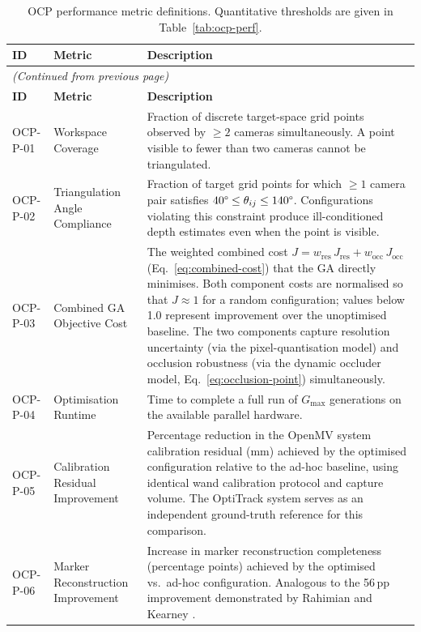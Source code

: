 {\small\setlength{\tabcolsep}{4pt}
\begin{longtable}{p{1.5cm} >{\raggedright\arraybackslash}p{3.2cm} >{\raggedright\arraybackslash}p{\dimexpr\linewidth-1.5cm-3.2cm-6\tabcolsep\relax}}
\caption[OCP performance metric definitions.]{OCP performance metric definitions. Quantitative thresholds are given in Table~\ref{tab:ocp-perf}.}
\label{tab:ocp-perf-desc}\\
\toprule
\textbf{ID} & \textbf{Metric} & \textbf{Description} \\
\midrule
\endfirsthead
\multicolumn{3}{l}{\small\textit{(Continued from previous page)}}\\[2pt]
\toprule
\textbf{ID} & \textbf{Metric} & \textbf{Description} \\
\midrule
\endhead
\bottomrule
\endlastfoot
OCP-P-01 & Workspace Coverage & Fraction of discrete target-space grid points observed by $\geq 2$ cameras simultaneously. A point visible to fewer than two cameras cannot be triangulated. \\[4pt]
OCP-P-02 & Triangulation Angle Compliance & Fraction of target grid points for which $\geq 1$ camera pair satisfies $40\degree \leq \theta_{ij} \leq 140\degree$. Configurations violating this constraint produce ill-conditioned depth estimates even when the point is visible. \\[4pt]
OCP-P-03 & Combined GA Objective Cost & The weighted combined cost $J = w_{\text{res}}\,J_{\text{res}} + w_{\text{occ}}\,J_{\text{occ}}$ (Eq.~\ref{eq:combined-cost}) that the \gls{GA} directly minimises. Both component costs are normalised so that $J \approx 1$ for a random configuration; values below 1.0 represent improvement over the unoptimised baseline. The two components capture resolution uncertainty (via the pixel-quantisation model) and occlusion robustness (via the dynamic occluder model, Eq.~\ref{eq:occlusion-point}) simultaneously. \\[4pt]
OCP-P-04 & Optimisation Runtime & Time to complete a full run of $G_{\max}$ generations on the available parallel hardware. \\[4pt]
OCP-P-05 & Calibration Residual Improvement & Percentage reduction in the OpenMV system calibration residual (mm) achieved by the optimised configuration relative to the ad-hoc baseline, using identical wand calibration protocol and capture volume. The OptiTrack system serves as an independent ground-truth reference for this comparison. \\[4pt]
OCP-P-06 & Marker Reconstruction Improvement & Increase in marker reconstruction completeness (percentage points) achieved by the optimised vs.\ ad-hoc configuration. Analogous to the 56\,pp improvement demonstrated by Rahimian and Kearney \parencite{rahimianOptimalCameraPlacement2017}. \\
\end{longtable}}

